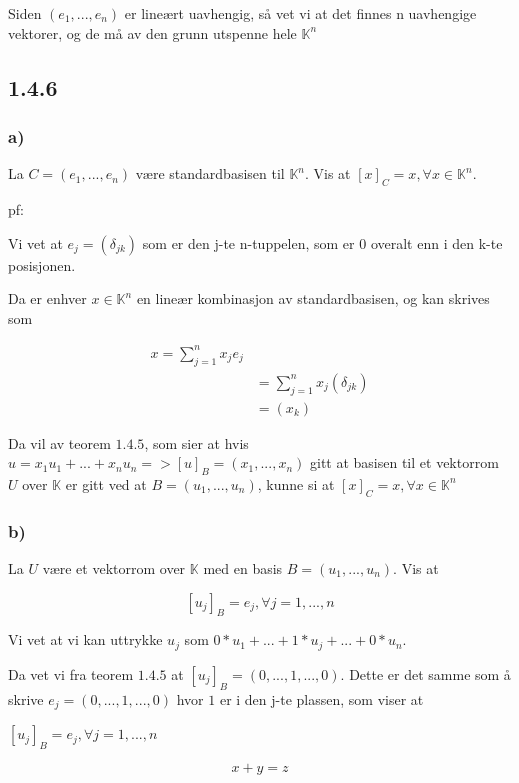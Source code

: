 \documentclass[11pt]{article}
\begin{document}
Siden $(e_1,...,e_n)$ er lineært uavhengig, så vet vi at det finnes n uavhengige vektorer, og de må av den grunn utspenne hele $\mathbb{K}^n$




\subsection{1.4.6}
\subsubsection{a)}

La $C = (e_1,..., e_n)$ være standardbasisen til $\mathbb{K}^n$. Vis at $[ x ]_C = x, \forall x \in \mathbb{K}^n$.

pf:

Vi vet at $e_j = (\delta_{jk})$ som er den j-te n-tuppelen, som er 0 overalt enn i den k-te posisjonen.

Da er enhver $x \in \mathbb{K}^n$ en lineær kombinasjon av standardbasisen, og kan skrives som

\begin{align*}
    x = \sum_{j=1}^{n} x_j e_j \\
    &= \sum_{j=1}^{n} x_j (\delta_{jk}) \\
    &= (x_k)
\end{align*}

\vspace{1em}

Da vil av teorem $1.4.5$, som sier at hvis $u = x_1 u_1+...+x_n u_n => [u]_B = (x_1,...,x_n)$ gitt at basisen til et vektorrom $U$ over $\mathbb{K}$ er gitt ved at $B=(u_1,...,u_n)$, kunne si at
$[x]_C = x,  \forall x \in \mathbb{K}^n$



\subsubsection{b)}

La $U$ være et vektorrom over $\mathbb{K}$ med en basis $B=(u_1,...,u_n)$. Vis at 

$$
[u_j]_B = e_j, \forall j =1,...,n
$$

Vi vet at vi kan uttrykke $u_j$ som $0 * u_1 + ... + 1 * u_j + ... + 0 * u_n$.

Da vet vi fra teorem $1.4.5$  at $[u_j]_B = (0,...,1,...,0)$. Dette er det samme som å skrive $e_j = (0,...,1,...,0)$ hvor $1$ er i den j-te plassen, som viser at

$[u_j]_B = e_j, \forall j = 1,...,n$


$$ x +y = z$$
\end{document}
